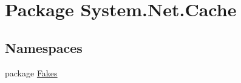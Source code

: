 \hypertarget{namespace_system_1_1_net_1_1_cache}{\section{Package System.\-Net.\-Cache}
\label{namespace_system_1_1_net_1_1_cache}
}
\subsection*{Namespaces}
\begin{DoxyCompactItemize}
\item 
package \hyperlink{namespace_system_1_1_net_1_1_cache_1_1_fakes}{Fakes}
\end{DoxyCompactItemize}
